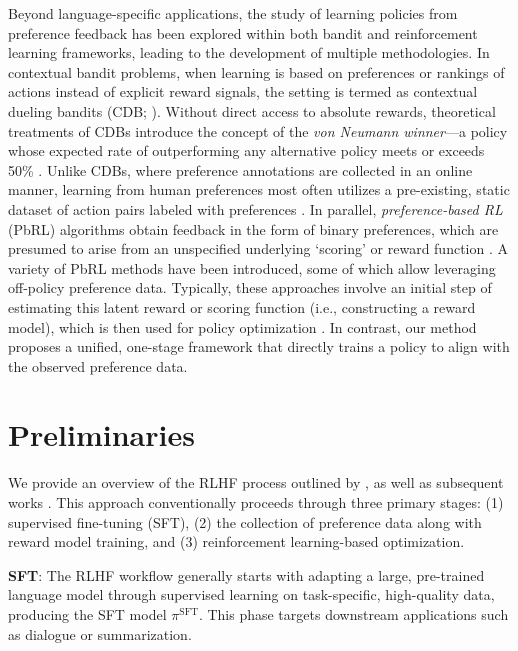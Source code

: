 Beyond language-specific applications, the study of learning policies from preference feedback has been explored within both bandit and reinforcement learning frameworks, leading to the development of multiple methodologies. In contextual bandit problems, when learning is based on preferences or rankings of actions instead of explicit reward signals, the setting is termed as contextual dueling bandits (CDB; \cite{yue2012karmed,dudik2015contextual}). Without direct access to absolute rewards, theoretical treatments of CDBs introduce the concept of the \textit{von Neumann winner}—a policy whose expected rate of outperforming any alternative policy meets or exceeds 50\% \citep{dudik2015contextual}. Unlike CDBs, where preference annotations are collected in an online manner, learning from human preferences most often utilizes a pre-existing, static dataset of action pairs labeled with preferences \citep{yan2022human}. In parallel, \textit{preference-based RL} (PbRL) algorithms obtain feedback in the form of binary preferences, which are presumed to arise from an unspecified underlying ‘scoring’ or reward function \citep{BusaFekete2014,ruiz2023dueling}. A variety of PbRL methods have been introduced, some of which allow leveraging off-policy preference data. Typically, these approaches involve an initial step of estimating this latent reward or scoring function (i.e., constructing a reward model), which is then used for policy optimization \citep{jain2013learning,BusaFekete2014,christiano2017deep,sadigh2017active,kupcsik2018learning}. In contrast, our method proposes a unified, one-stage framework that directly trains a policy to align with the observed preference data.

\section{Preliminaries}\label{section:prelims}

We provide an overview of the RLHF process outlined by \citeauthor{ziegler2020finetuning}, as well as subsequent works \citep{stiennon2022learning, bai2022training, ouyang2022training}. This approach conventionally proceeds through three primary stages: (1) supervised fine-tuning (SFT), (2) the collection of preference data along with reward model training, and (3) reinforcement learning-based optimization.

\textbf{SFT}: The RLHF workflow generally starts with adapting a large, pre-trained language model through supervised learning on task-specific, high-quality data, producing the SFT model $\pi^\text{SFT}$. This phase targets downstream applications such as dialogue or summarization.

